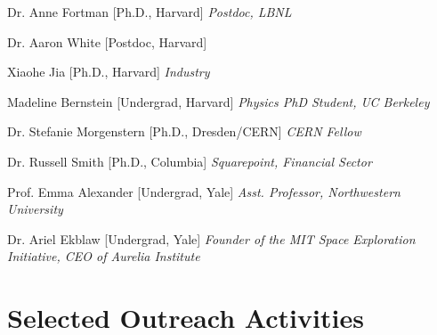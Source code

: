 \documentclass[11pt,letterpaper]{article}
\begin{document}
\begin{itemizetighter}
      \item Dr. Anne Fortman [Ph.D., Harvard] \hfill \emph{Postdoc, LBNL}
      \item Dr. Aaron White [Postdoc, Harvard] \hfill \emph{}
      \item Xiaohe Jia [Ph.D., Harvard] \hfill \emph{Industry}
      \item Madeline Bernstein [Undergrad, Harvard] \hfill \emph{Physics PhD Student, UC Berkeley}
      \item Dr. Stefanie Morgenstern [Ph.D., Dresden/CERN] \hfill \emph{CERN Fellow}
      \item Dr. Russell Smith [Ph.D., Columbia] \hfill \emph{Squarepoint, Financial Sector}
      \item Prof. Emma Alexander [Undergrad, Yale] \hfill \emph{Asst. Professor, Northwestern University}
      \item Dr. Ariel Ekblaw [Undergrad, Yale] \hfill \emph{Founder of the MIT Space Exploration Initiative, CEO of Aurelia Institute}
    \end{itemizetighter}


\section*{Selected Outreach Activities}
\end{document}
